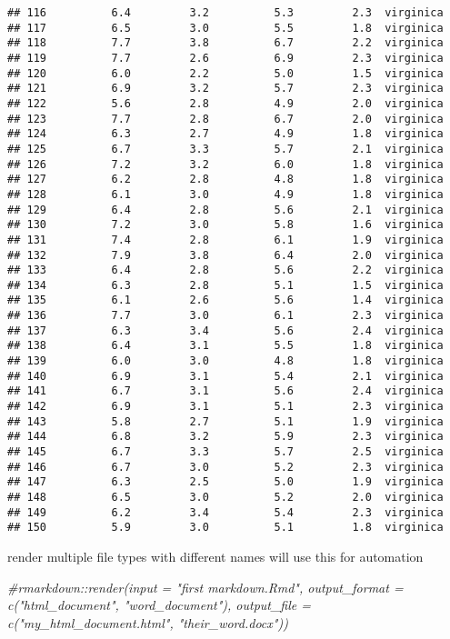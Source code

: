 \documentclass[]{article}
\newenvironment{Shaded}{\begin{snugshade}}{\end{snugshade}}
\newcommand{\CommentTok}[1]{\textcolor[rgb]{0.56,0.35,0.01}{\textit{#1}}}
\begin{document}
\begin{verbatim}
## 116          6.4         3.2          5.3         2.3  virginica
## 117          6.5         3.0          5.5         1.8  virginica
## 118          7.7         3.8          6.7         2.2  virginica
## 119          7.7         2.6          6.9         2.3  virginica
## 120          6.0         2.2          5.0         1.5  virginica
## 121          6.9         3.2          5.7         2.3  virginica
## 122          5.6         2.8          4.9         2.0  virginica
## 123          7.7         2.8          6.7         2.0  virginica
## 124          6.3         2.7          4.9         1.8  virginica
## 125          6.7         3.3          5.7         2.1  virginica
## 126          7.2         3.2          6.0         1.8  virginica
## 127          6.2         2.8          4.8         1.8  virginica
## 128          6.1         3.0          4.9         1.8  virginica
## 129          6.4         2.8          5.6         2.1  virginica
## 130          7.2         3.0          5.8         1.6  virginica
## 131          7.4         2.8          6.1         1.9  virginica
## 132          7.9         3.8          6.4         2.0  virginica
## 133          6.4         2.8          5.6         2.2  virginica
## 134          6.3         2.8          5.1         1.5  virginica
## 135          6.1         2.6          5.6         1.4  virginica
## 136          7.7         3.0          6.1         2.3  virginica
## 137          6.3         3.4          5.6         2.4  virginica
## 138          6.4         3.1          5.5         1.8  virginica
## 139          6.0         3.0          4.8         1.8  virginica
## 140          6.9         3.1          5.4         2.1  virginica
## 141          6.7         3.1          5.6         2.4  virginica
## 142          6.9         3.1          5.1         2.3  virginica
## 143          5.8         2.7          5.1         1.9  virginica
## 144          6.8         3.2          5.9         2.3  virginica
## 145          6.7         3.3          5.7         2.5  virginica
## 146          6.7         3.0          5.2         2.3  virginica
## 147          6.3         2.5          5.0         1.9  virginica
## 148          6.5         3.0          5.2         2.0  virginica
## 149          6.2         3.4          5.4         2.3  virginica
## 150          5.9         3.0          5.1         1.8  virginica
\end{verbatim}

render multiple file types with different names will use this for
automation

\begin{Shaded}
\begin{Highlighting}[]
\CommentTok{\#rmarkdown::render(input = "first markdown.Rmd", output\_format = c("html\_document", "word\_document"), output\_file = c("my\_html\_document.html", "their\_word.docx"))}
\end{Highlighting}
\end{Shaded}
\end{document}
